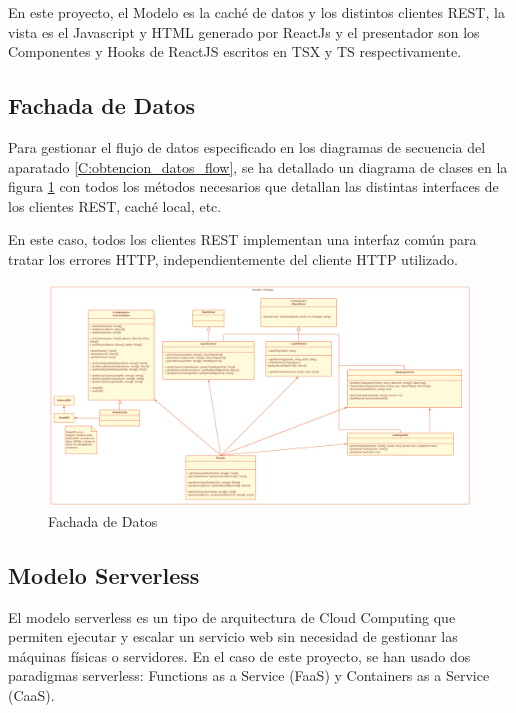 En este proyecto, el Modelo es la caché de datos y los distintos clientes REST, la vista es el Javascript y HTML generado por ReactJs y el presentador son los Componentes y Hooks de ReactJS escritos en TSX y TS respectivamente. 

\subsection{Fachada de Datos}\label{C:fachada_datos}

Para gestionar el flujo de datos especificado en los diagramas de secuencia  del aparatado \ref{C:obtencion_datos_flow}, se ha detallado un diagrama de clases en la figura \ref{fig:C:facade} con todos los métodos necesarios que detallan las distintas interfaces de los clientes REST, caché local, etc.

En este caso, todos los clientes REST implementan una interfaz común para tratar los errores HTTP, independientemente del cliente HTTP utilizado. 

\begin{figure}
    \centering
    \includegraphics[angle=90,width=\linewidth,height=\textheight,keepaspectratio]{img/C/facade.png}
    \caption{Fachada de Datos}
    \label{fig:C:facade}
\end{figure}


\subsection{Modelo Serverless}

El modelo serverless es un tipo de arquitectura de Cloud Computing que permiten ejecutar y escalar un servicio web sin necesidad de gestionar las máquinas físicas o servidores. 
En el caso de este proyecto, se han usado dos paradigmas serverless: Functions as a Service (FaaS) y Containers as a Service (CaaS). 

